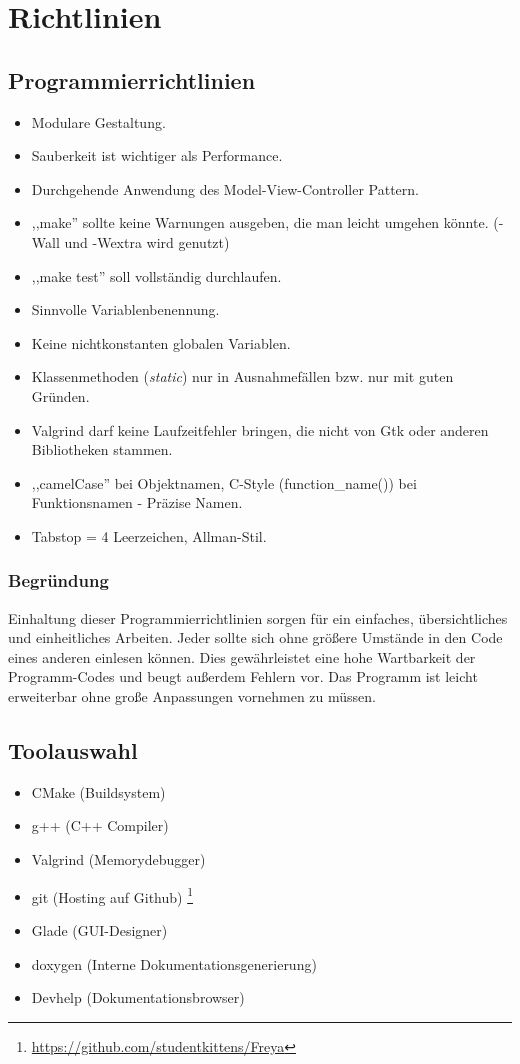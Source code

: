 \chapter{Richtlinien}
\section{Programmierrichtlinien}
\renewcommand{\labelitemi}{•}
\begin{itemize}
\item Modulare Gestaltung.
\item Sauberkeit ist wichtiger als Performance.
\item Durchgehende Anwendung des Model-View-Controller Pattern.
\item ,,make'' sollte keine Warnungen ausgeben, die man leicht umgehen könnte. (-Wall und -Wextra wird genutzt)
\item ,,make test'' soll vollständig durchlaufen.
\item Sinnvolle Variablenbenennung.
\item Keine nichtkonstanten globalen Variablen.
\item Klassenmethoden (\emph{static}) nur in Ausnahmefällen bzw. nur mit guten Gründen.
\item Valgrind darf keine Laufzeitfehler bringen, die nicht von Gtk oder anderen Bibliotheken stammen.
\item ,,camelCase'' bei Objektnamen, C-Style (function\_name()) bei Funktionsnamen - Präzise Namen.
\item Tabstop = 4 Leerzeichen, Allman-Stil.
\end{itemize}
\subsection{Begründung}
Einhaltung dieser Programmierrichtlinien sorgen für ein einfaches, übersichtliches und einheitliches Arbeiten.
Jeder sollte sich ohne größere Umstände in den Code eines anderen einlesen können. Dies gewährleistet eine
hohe Wartbarkeit der Programm-Codes und beugt außerdem Fehlern vor. Das Programm ist leicht
erweiterbar ohne große Anpassungen vornehmen zu müssen.
\section{Toolauswahl}
\begin{itemize}
\item CMake (Buildsystem)
\item g++ (C++ Compiler)
\item Valgrind (Memorydebugger)
\item git (Hosting auf Github) \footnote{\url{https://github.com/studentkittens/Freya}}
\item Glade (GUI-Designer)
\item doxygen  (Interne Dokumentationsgenerierung)
\item Devhelp (Dokumentationsbrowser)
\end{itemize}
